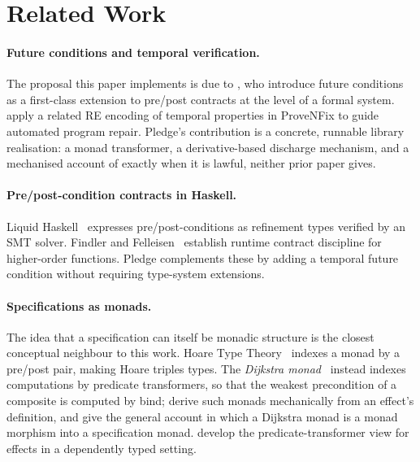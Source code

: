 \documentclass[acmsmall,screen]{acmart}
\begin{document}
\section{Related Work}
\label{sec:related}

\paragraph{Future conditions and temporal verification.}
The proposal this paper implements is due to \citet{song2025futurecond},
who introduce future conditions as a first-class extension to pre/post
contracts at the level of a formal system.
\citet{song2024provenfix} apply a related RE encoding of temporal
properties in ProveNFix to guide automated program repair.
Pledge's contribution is a concrete, runnable library realisation: a monad
transformer, a derivative-based discharge mechanism, and a mechanised
account of exactly when it is lawful, neither prior paper gives.

\paragraph{Pre/post-condition contracts in Haskell.}
Liquid Haskell~\cite{vazou2014} expresses pre/post-conditions as refinement
types verified by an SMT solver.
Findler and Felleisen~\cite{findler2002} establish runtime contract discipline
for higher-order functions.
Pledge complements these by adding a temporal future condition without
requiring type-system extensions.

\paragraph{Specifications as monads.}
The idea that a specification can itself be monadic structure is the
closest conceptual neighbour to this work.
Hoare Type Theory~\cite{nanevski2008htt} indexes a monad by a pre/post
pair, making Hoare triples types.
The \emph{Dijkstra monad}~\cite{swamy2013dijkstra} instead indexes
computations by predicate transformers, so that the weakest precondition of
a composite is computed by bind;
\citet{ahman2017dijkstra} derive such monads mechanically from an effect's
definition, and \citet{maillard2019dijkstra} give the general account in
which a Dijkstra monad is a monad morphism into a specification monad.
\citet{swierstra2019} develop the predicate-transformer view for effects in
a dependently typed setting.
\end{document}
